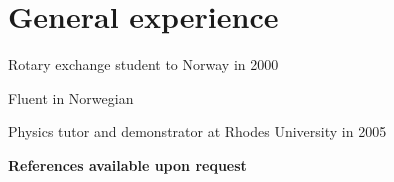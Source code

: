 \documentclass{article}
\begin{document}
\section*{General experience}
\begin{itemize*}
\item{	Rotary exchange student to Norway in 2000}
\item{	Fluent in Norwegian}
\item{	Physics tutor and demonstrator at Rhodes University in 2005}
\end{itemize*}

\textbf{References available upon request}
 
\end{document}
